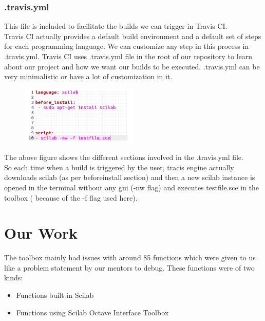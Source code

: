 \documentclass[12pt,a4paper]{report}
\begin{document}
\subsection{.travis.yml}
This file is included to facilitate the builds we can trigger in Travis CI. \\
Travis CI actually provides a default build environment and a default set of steps for each programming language. We can customize any step in this process in .travis.yml. Travis CI uses .travis.yml file in the root of our repository to learn about our project and how we want our builds to be executed. .travis.yml can be very minimalistic or have a lot of customization in it.

\begin{figure}[H]
\centering
\includegraphics[width = 0.5\textwidth]{travisyml.png}
\end{figure}

The above figure shows the different sections involved in the .travis.yml file.\\
So each time when a build is triggered by the user, tracis engine actually downloads scilab (as per before\textunderscore install section) and then a new scilab instance is opened in the terminal without any gui (-nw flag) and executes testfile.sce in the toolbox ( because of the -f flag used here).

\chapter{\textbf{Our Work}}
                   
The toolbox mainly had issues with around 85 functions which were given to us like a problem statement by our mentors to debug. These functions were of two kinds:\\


\begin{itemize}
\item Functions built in Scilab
\item Functions using Scilab Octave Interface Toolbox\\
\end{itemize}
\end{document}
